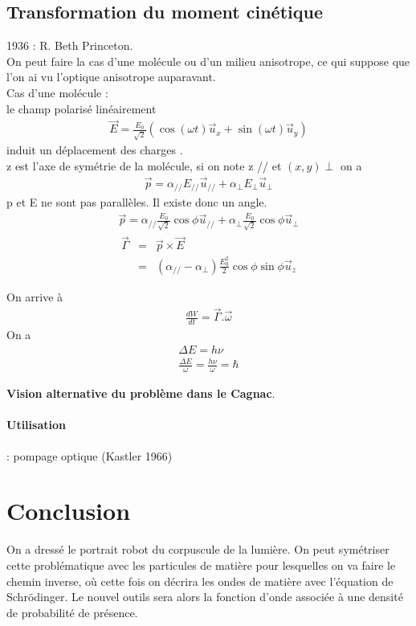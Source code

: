 \documentclass[12pt,prb,aps,epsf]{article}
\begin{document}
\subsection{Transformation du moment cinétique}
1936 : R. Beth Princeton.\\
On peut faire la cas d'une molécule ou d'un milieu anisotrope, ce qui suppose que l'on ai vu l'optique anisotrope auparavant.\\

Cas d'une molécule :\\
le champ polarisé linéairement
\begin{eqnarray}
\vec{E} = \frac{E_0}{\sqrt{2}} (\cos(\omega t)\vec{u}_x + \sin(\omega t) \vec{u}_y)
\end{eqnarray}
induit un déplacement des charges .\\
z est l'axe de symétrie de la molécule, si on note z // et $(x,y) \perp$ on a 
\begin{eqnarray}
\vec{p} = \alpha_{//} E_{//} \vec{u}_{//} + \alpha_{\perp} E_{\perp} \vec{u}_{\perp}
\end{eqnarray}
p et E ne sont pas parallèles. Il existe donc un angle. 
\begin{eqnarray}
\vec{p} = \alpha_{//}\frac{E_0}{\sqrt{2}} \cos \phi \vec{u}_{//} + \alpha_{\perp} \frac{E_0}{\sqrt{2}} \cos \phi \vec{u}_{\perp}
\end{eqnarray}
\begin{eqnarray}
\vec{\Gamma} &=& \vec{p}\times \vec{E}\\
&=& (\alpha_{//} - \alpha_{\perp}) \frac{E_0^2}{2} \cos \phi \sin \phi \vec{u}_z
\end{eqnarray}

On arrive à 
\begin{eqnarray}
\frac{d W}{dt} = \vec{\Gamma}.\vec{\omega}
\end{eqnarray}
On a
\begin{eqnarray}
\Delta E = h\nu\\\frac{\Delta E}{\omega} = \frac{h\nu}{\omega} = \hbar
\end{eqnarray}

\textbf{Vision alternative du problème dans le Cagnac}.

\paragraph{Utilisation} : pompage optique (Kastler 1966)

\section{Conclusion}
On a dressé le portrait robot du corpuscule de la lumière. On peut symétriser cette problématique avec les particules de matière pour lesquelles on va faire le chemin inverse, où cette fois on décrira les ondes de matière avec l'équation de Schrödinger. Le nouvel outils sera alors la fonction d'onde associée à une densité de probabilité de présence.\\
\end{document}
